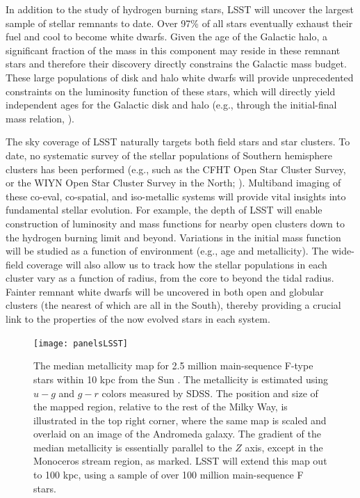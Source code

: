 
In addition to the study of hydrogen burning stars, LSST will uncover the largest sample of stellar remnants to date.
Over 97\% of all stars eventually exhaust their fuel and cool to become white dwarfs. Given the age of the Galactic
halo, a significant fraction of the mass in this component may reside in these remnant stars
\citep[e.g.,][]{2000ApJ...542..281A,2007A&A...469..387T}
and therefore their discovery directly constrains the Galactic mass budget.  These large
populations of disk and halo white dwarfs will provide unprecedented constraints on the luminosity function of
these stars, which will directly yield independent ages for the Galactic disk and halo (e.g., through the initial-final mass
relation, \citet{2008ApJ...676..594K}).

The sky coverage of LSST naturally targets both field stars and star clusters.  To date, no systematic survey of the stellar
populations of Southern hemisphere clusters has been performed (e.g., such as the CFHT Open Star Cluster Survey, or
the WIYN Open Star Cluster Survey in the North; \citealt{2001AJ....122..257K,2000ASPC..198..517M}).  Multiband imaging of these co-eval,
co-spatial, and iso-metallic systems will provide vital insights into fundamental stellar evolution.  For example, the depth
of LSST will enable construction of  luminosity and mass functions for nearby open clusters down to the hydrogen burning
limit and beyond.  Variations in the initial mass function will be studied as a function of environment (e.g., age and metallicity).
The wide-field coverage will also allow us to track how the stellar populations in each cluster vary as a function of radius,
from the core to beyond the tidal radius. Fainter remnant white dwarfs will be uncovered in both open and globular clusters
(the nearest of which are all in the South), thereby providing a crucial link to the properties of the now evolved stars in each
system.



\begin{figure}
\texttt{[image: panelsLSST]}
\caption{
The median metallicity map for 2.5 million main-sequence F-type stars within 10 kpc
from the Sun \citep[adapted from][]{2008ApJ...684..287I}. The metallicity is estimated using
$u-g$ and $g-r$ colors measured by SDSS. The position and size of the mapped
region, relative to the rest of the Milky Way, is illustrated in the top right
corner, where the same map is scaled and overlaid on an image of the Andromeda
galaxy. The gradient of the median metallicity is essentially parallel
to the $Z$ axis, except in the Monoceros stream region, as marked. LSST
will extend this map out to 100 kpc, using a sample of over 100 million
main-sequence F stars.}
\label{Fig:FeH3}
\end{figure}


